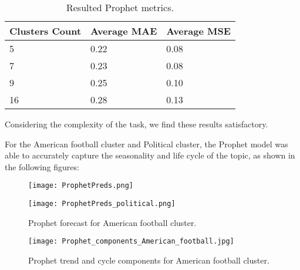 \begin{table}[h]
\centering
\begin{tabular}{|l|l|l|}
\hline
\textbf{Clusters Count} & \textbf{Average MAE} & \textbf{Average MSE} \\ \hline
5                       & 0.22                 & 0.08                 \\ \hline
7                       & 0.23                 & 0.08                 \\ \hline
9                       & 0.25                 & 0.10                 \\ \hline
16                      & 0.28                 & 0.13                 \\ \hline
\end{tabular}
\caption{Resulted Prophet metrics.}
\label{tab:ProphetMetrics}
\end{table}

Considering the complexity of the task, we find these results satisfactory.


For the American football cluster and Political cluster, the Prophet model was able to accurately capture the seasonality and life cycle of the topic, as shown in the following figures:

\begin{figure}[h]
  \begin{minipage}{0.5\textwidth}
    \centering
    \texttt{[image: ProphetPreds.png]}
  \end{minipage}\hfill
  \begin{minipage}{0.5\textwidth}
    \centering
    \texttt{[image: ProphetPreds\_political.png]}
  \end{minipage}
  \caption{Prophet forecast for American football cluster.}
\end{figure}




\begin{figure}[h] 
    \centering
    \texttt{[image: Prophet\_components\_American\_football.jpg]}
    \label{fig:Prophet_components_American_football}
    \caption{Prophet trend and cycle components for American football cluster.}
\end{figure}


